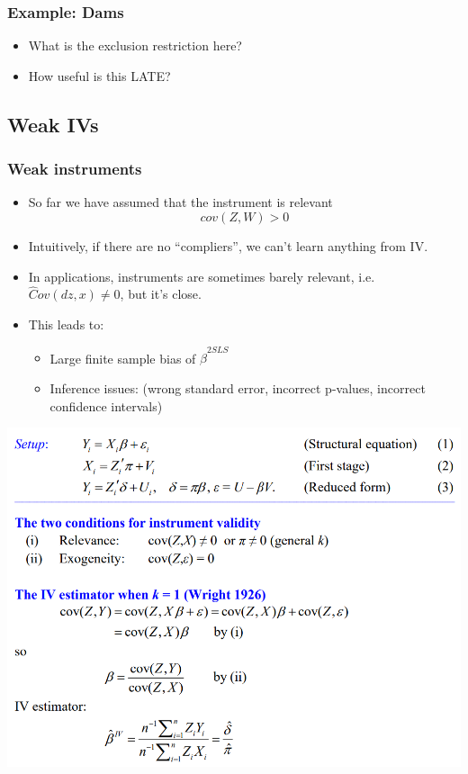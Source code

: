 \begin{frame}
  \frametitle{Example: Dams}
  \begin{itemize}
    \item What is the exclusion restriction here? 
    \item How useful is this LATE?
  \end{itemize}
\end{frame}

\subsection{Weak IVs}

\begin{frame}
  \frametitle{Weak instruments}
  \begin{itemize}
    \item So far we have assumed that the instrument is \alert{relevant}
    $$ cov(Z,W) > 0 $$
    \item Intuitively, if there are no ``compliers'', we can't learn anything from IV. 
    \item In applications, instruments are sometimes barely
    relevant, i.e. $\hat Cov( d z, x) \neq 0$, but it's close.
    \item This leads to: 
    \begin{itemize}
      \item Large finite sample bias of $\hat \beta^{2SLS}$
      \item Inference issues: 
    (wrong standard error, incorrect p-values, incorrect
    confidence intervals)
    \end{itemize} 
   \end{itemize}
\end{frame}

\begin{frame}{}
  \begin{center}
    \includegraphics[width=1\textwidth]{./resources/StockNBERIV}
  \end{center}  
\end{frame}



